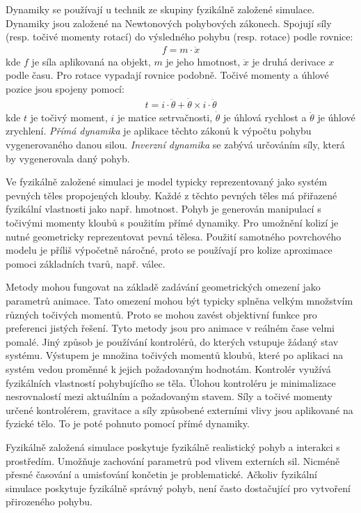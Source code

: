 Dynamiky se používají u technik ze skupiny fyzikálně založené simulace. Dynamiky jsou založené na Newtonových pohybových zákonech. Spojují síly (resp. točivé momenty rotací) do výsledného pohybu (resp. rotace) podle rovnice: 
\begin{eqnarray}
f=m \cdot \ddot{x}\label{r.dynamics1}
\end{eqnarray}
kde $f$ je síla aplikovaná na objekt, $m$ je jeho hmotnost, $\ddot{x}$ je druhá derivace $x$ podle času. Pro rotace vypadají rovnice podobně. Točivé momenty a úhlové pozice jsou spojeny pomocí:
\begin{eqnarray}
t=i \cdot \ddot{\theta} + \dot{\theta} \times i \cdot \ddot{\theta}\label{r.dynamics2}
\end{eqnarray} 
kde $t$ je točivý moment, $i$ je matice setrvačnosti, $\dot{\theta}$ je úhlová rychlost a $\ddot{\theta}$ je úhlové zrychlení. \textit{Přímá dynamika} je aplikace těchto zákonů k výpočtu pohybu vygenerovaného danou silou. \textit{Inverzní dynamika} se zabývá určováním síly, která by vygenerovala daný pohyb.

Ve fyzikálně založené simulaci je model typicky reprezentovaný jako systém pevných těles propojených klouby. Každé z těchto pevných těles má přiřazené fyzikální vlastnosti jako např. hmotnost. Pohyb je generován manipulací s točivými momenty kloubů s použitím přímé dynamiky. Pro umožnění kolizí je nutné geometricky reprezentovat pevná tělesa. Použití samotného povrchového modelu je příliš výpočetně náročné, proto se používají pro kolize aproximace pomoci základních tvarů, např. válec.

Metody mohou fungovat na základě zadávání geometrických omezení jako parametrů animace. Tato omezení mohou být typicky splněna velkým množstvím různých točivých momentů. Proto se mohou zavést objektivní funkce pro preferenci jistých řešení. Tyto metody jsou pro animace v reálném čase velmi pomalé. Jiný způsob je používání kontrolérů, do kterých vstupuje žádaný stav systému. Výstupem je množina točivých momentů kloubů, které po aplikaci na systém vedou proměnné k jejich požadovaným hodnotám. Kontrolér využívá fyzikálních vlastností pohybujícího se těla. Úlohou kontroléru je minimalizace nesrovnalostí mezi aktuálním a požadovaným stavem. Síly a točivé momenty určené kontrolérem, gravitace a síly způsobené externími vlivy jsou aplikované na fyzické tělo. To je poté pohnuto pomocí přímé dynamiky. 

Fyzikálně založená simulace poskytuje fyzikálně realistický pohyb a interakci s prostředím. Umožňuje zachování parametrů pod vlivem externích sil. Nicméně přesné časování a umisťování končetin je problematické. Ačkoliv fyzikální simulace poskytuje fyzikálně správný pohyb, není často dostačující pro vytvoření přirozeného pohybu. 

